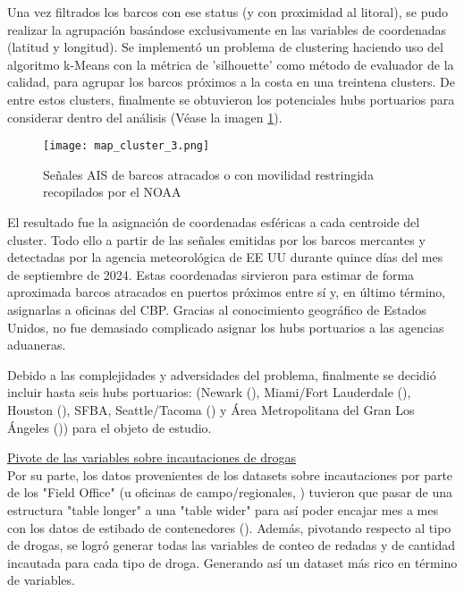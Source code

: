 \documentclass[12pt]{article}
\begin{document}
		Una vez filtrados los barcos con ese status (y con proximidad al litoral), se pudo realizar la agrupación basándose exclusivamente en las variables de coordenadas (latitud y longitud). Se implementó un problema de clustering haciendo uso del algoritmo k-Means con la métrica de 'silhouette' como método de evaluador de la calidad, para agrupar los barcos próximos a la costa en una treintena clusters. De entre estos clusters, finalmente se obtuvieron los potenciales hubs portuarios para considerar dentro del análisis (Véase la imagen \ref{map_cluster_3}).
		
		\begin{figure}[H]
			\caption{\label{map_cluster_3} Señales AIS de barcos atracados o con movilidad restringida recopilados por el NOAA}
			\centering
			\texttt{[image: map\_cluster\_3.png]}
		\end{figure}
		
		 El resultado fue la asignación de coordenadas esféricas a cada centroide del cluster. Todo ello a partir de las señales emitidas por los barcos mercantes y detectadas por la agencia meteorológica de EE UU durante quince días del mes de septiembre de 2024. Estas coordenadas sirvieron para estimar de forma aproximada barcos atracados en puertos próximos entre sí y, en último término, asignarlas a oficinas del CBP. Gracias al conocimiento geográfico de Estados Unidos, no fue demasiado complicado asignar los hubs portuarios a las agencias aduaneras.
		 
		 Debido a las complejidades y adversidades del problema, finalmente se decidió incluir hasta seis hubs portuarios: (Newark (\cite{panynj2025facts}), Miami/Fort Lauderdale (\cite{porteverglades2025stats}), Houston (\cite{porthouston2025teus}), SFBA, Seattle/Tacoma (\cite{nwseaportalliance2025cargo}) y Área Metropolitana del Gran Los Ángeles (\cite{portla2025containerstats})) para el objeto de estudio.
		 
		 \underline{Pivote de las variables sobre incautaciones de drogas}\\
		 Por su parte, los datos provenientes de los datasets sobre incautaciones por parte de los "Field Office" (u oficinas de campo/regionales, \cite{cbp2025drugseizures}) tuvieron que pasar de una estructura "table longer" a una "table wider" para así poder encajar mes a mes con los datos de estibado de contenedores (\cite{cbp2022drugseizures}). Además, pivotando respecto al tipo de drogas, se logró generar todas las variables de conteo de redadas y de cantidad incautada para cada tipo de droga. Generando así un dataset más rico en término de variables.
		 
\end{document}
